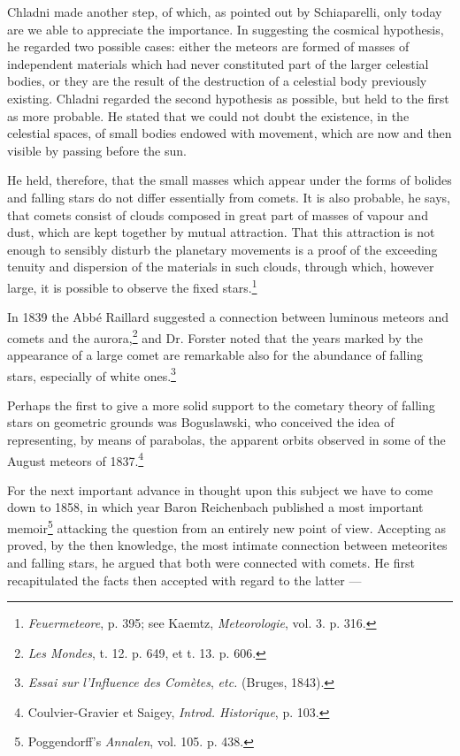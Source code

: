 \documentclass[a4paper, 12pt, oneside, polutonikogreek, english]{article}
\begin{document}
Chladni made another step, of which, as pointed out by Schiaparelli, only today are we able to appreciate the importance. In suggesting the cosmical hypothesis, he regarded two possible cases: either the meteors are formed of masses of independent materials which had never constituted part of the larger celestial bodies, or they are the result of the destruction of a celestial body previously existing. Chladni regarded the second hypothesis as possible, but held to the first as more probable. He stated that we could not doubt the existence, in the celestial spaces, of small bodies endowed with movement, which are now and then visible by passing before the sun.

He held, therefore, that the small masses which appear under the forms of bolides and falling stars do not differ essentially from comets. It is also probable, he says, that comets consist of clouds composed in great part of masses of vapour and dust, which are kept together by mutual attraction. That this attraction is not enough to sensibly disturb the planetary movements is a proof of the exceeding tenuity and dispersion of the materials in such clouds, through which, however large, it is possible to observe the fixed stars.\footnote{\emph{Feuermeteore}, p. 395; see Kaemtz, \emph{Meteorologie}, vol. 3. p. 316.}

In 1839 the Abbé Raillard suggested a connection between luminous meteors and comets and the aurora,\footnote{\emph{Les Mondes}, t. 12. p. 649, et t. 13. p. 606.} and Dr. Forster noted that the years marked by the appearance of a large comet are remarkable also for the abundance of falling stars, especially of white ones.\footnote{\emph{Essai sur l'Influence des Comètes}, \emph{etc.} (Bruges, 1843).}

Perhaps the first to give a more solid support to the cometary theory of falling stars on geometric grounds was Boguslawski, who conceived the idea of representing, by means of parabolas, the apparent orbits observed in some of the August meteors of 1837.\footnote{Coulvier-Gravier et Saigey, \emph{Introd. Historique}, p. 103.}

For the next important advance in thought upon this subject we have to come down to 1858, in which year Baron Reichenbach published a most important memoir\footnote{Poggendorff's \emph{Annalen}, vol. 105. p. 438.} attacking the question from an entirely new point of view. Accepting as proved, by the then knowledge, the most intimate connection between meteorites and falling stars, he argued that both were connected with comets. He first recapitulated the facts then accepted with regard to the latter ---
\end{document}
